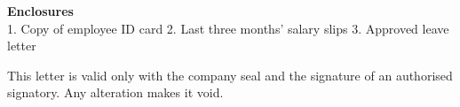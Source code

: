 \documentclass[10pt]{article}
\begin{document}
\vspace{12pt}

\noindent\colorbox{notebg}{\parbox{\dimexpr\linewidth-2\fboxsep}{\footnotesize {\color{accent}\bfseries Enclosures}\\ 1. Copy of employee ID card  2. Last three months' salary slips  3. Approved leave letter}}\par\vspace{6pt}

\noindent\colorbox{notebg}{\parbox{\dimexpr\linewidth-2\fboxsep}{\footnotesize This letter is valid only with the company seal and the signature of an authorised signatory. Any alteration makes it void.}}\par\vspace{6pt}
\end{document}

